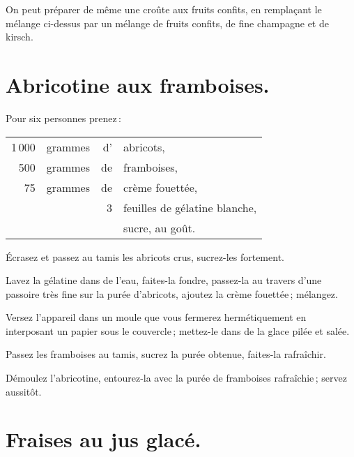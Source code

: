 \sk

On peut préparer de même une croûte aux fruits confits, en remplaçant le
mélange ci-dessus par un mélange de fruits confits, de fine champagne et de
kirsch.

\section*{\centering Abricotine aux framboises.}
{}

Pour six personnes prenez :

\footnotesize
\begin{longtable}{rrrp{16em}}
  1 000 & grammes & d' & abricots,                                                                        \\
    500 & grammes & de & framboises,                                                                      \\
     75 & grammes & de & crème fouettée,                                                                  \\
        &         &  3 & feuilles de gélatine blanche,                                                    \\
        &         &    & sucre, au goût.                                                                  \\
\end{longtable}
\normalsize

Écrasez et passez au tamis les abricots crus, sucrez-les fortement.

Lavez la gélatine dans de l’eau, faites-la fondre, passez-la au travers d'une
passoire très fine sur la purée d’abricots, ajoutez la crème fouettée ;
mélangez.

Versez l'appareil dans un moule que vous fermerez hermétiquement en interposant
un papier sous le couvercle ; mettez-le dans de la glace pilée et salée.

Passez les framboises au tamis, sucrez la purée obtenue, faites-la rafraîchir.

Démoulez l'abricotine, entourez-la avec la purée de framboises rafraîchie ;
servez aussitôt.

\section*{\centering Fraises au jus glacé.}
{}

